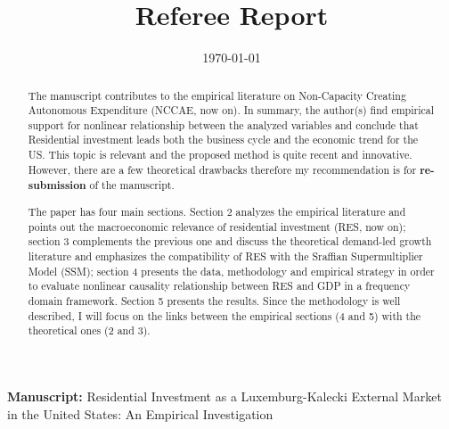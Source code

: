 \documentclass[11pt]{article}
\date{\today}
\title{Referee Report}
\begin{document}
\maketitle
\noindent \textbf{Manuscript:} Residential Investment as a Luxemburg-Kalecki External Market in the United States: An Empirical Investigation

\begin{abstract}
The manuscript contributes to the empirical literature on Non-Capacity Creating Autonomous Expenditure (NCCAE, now on). In summary, the author(s) find empirical support for nonlinear relationship between the analyzed variables and conclude that Residential investment leads both the business cycle and the economic trend for the US. This topic is relevant and the proposed method is quite recent and innovative. However, there are a few theoretical drawbacks therefore my recommendation is for \textbf{re-submission} of the manuscript.

The paper has four main sections. Section 2 analyzes the empirical literature and points out the macroeconomic relevance of residential investment (RES, now on); section 3 complements the previous one and discuss the theoretical demand-led growth literature and emphasizes the compatibility of RES with the Sraffian Supermultiplier Model (SSM); section 4 presents the data, methodology and empirical strategy in order to evaluate nonlinear causality relationship between RES and GDP in a frequency domain framework. Section 5 presents the results. Since the methodology is well described, I will focus on the links between the empirical sections (4 and 5) with the theoretical ones (2 and 3).
\end{abstract}
\end{document}

